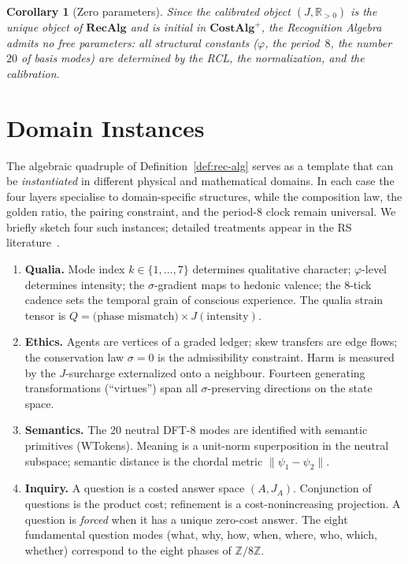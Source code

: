 \documentclass[11pt,a4paper]{article}
\theoremstyle{plain}
\newtheorem{corollary}[theorem]{Corollary}
\theoremstyle{definition}
\theoremstyle{remark}
\newcommand{\phig}{\varphi}
\newcommand{\Jcost}{J}
\newcommand{\RR}{\mathbb{R}}
\newcommand{\ZZ}{\mathbb{Z}}
\begin{document}
\begin{corollary}[Zero parameters]\label{cor:zero-params}
Since the calibrated object $(\Jcost,\RR_{>0})$ is the unique object
of $\mathbf{RecAlg}$ and is initial in $\mathbf{CostAlg}^{+}$, the
Recognition Algebra admits no free parameters: all structural
constants ($\phig$, the period~$8$, the number~$20$ of basis modes)
are determined by the RCL, the normalization, and the calibration.
\end{corollary}


\section{Domain Instances}\label{sec:domains}

The algebraic quadruple of Definition~\ref{def:rec-alg} serves as a
template that can be \emph{instantiated} in different physical and
mathematical domains.  In each case the four layers specialise to
domain-specific structures, while the composition law, the golden
ratio, the pairing constraint, and the period-8 clock remain
universal.  We briefly sketch four such instances; detailed treatments
appear in the RS literature~\cite{washburn2025axioms}.

\begin{enumerate}[leftmargin=*]
\item \textbf{Qualia.}
  Mode index $k\in\{1,\ldots,7\}$ determines qualitative character;
  $\phig$-level determines intensity; the $\sigma$-gradient maps to
  hedonic valence; the 8-tick cadence sets the temporal grain of
  conscious experience.  The qualia strain tensor is
  $Q=\text{(phase mismatch)}\times\Jcost(\text{intensity})$.

\item \textbf{Ethics.}
  Agents are vertices of a graded ledger; skew transfers are edge
  flows; the conservation law $\sigma=0$ is the admissibility
  constraint.  Harm is measured by the $\Jcost$-surcharge externalized
  onto a neighbour.  Fourteen generating transformations (``virtues'')
  span all $\sigma$-preserving directions on the state space.

\item \textbf{Semantics.}
  The 20 neutral DFT-8 modes are identified with semantic primitives
  (WTokens).  Meaning is a unit-norm superposition in the neutral
  subspace; semantic distance is the chordal metric
  $\|\psi_1-\psi_2\|$.

\item \textbf{Inquiry.}
  A question is a costed answer space $(A,\Jcost_A)$.  Conjunction
  of questions is the product cost; refinement is a cost-nonincreasing
  projection.  A question is \emph{forced} when it has a unique
  zero-cost answer.  The eight fundamental question modes (what, why,
  how, when, where, who, which, whether) correspond to the eight
  phases of $\ZZ/8\ZZ$.
\end{enumerate}
\end{document}
